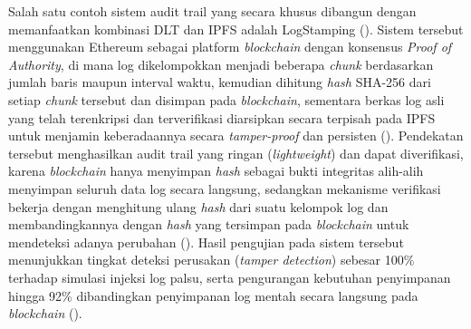 Salah satu contoh sistem audit trail yang secara khusus dibangun dengan memanfaatkan kombinasi DLT dan IPFS adalah LogStamping (\cite{islam2025logstamping}). Sistem tersebut menggunakan Ethereum sebagai platform \textit{blockchain} dengan konsensus \textit{Proof of Authority}, di mana log dikelompokkan menjadi beberapa \textit{chunk} berdasarkan jumlah baris maupun interval waktu, kemudian dihitung \textit{hash} SHA-256 dari setiap \textit{chunk} tersebut dan disimpan pada \textit{blockchain}, sementara berkas log asli yang telah terenkripsi dan terverifikasi diarsipkan secara terpisah pada IPFS untuk menjamin keberadaannya secara \textit{tamper-proof} dan persisten (\cite{islam2025logstamping}). Pendekatan tersebut menghasilkan audit trail yang ringan (\textit{lightweight}) dan dapat diverifikasi, karena \textit{blockchain} hanya menyimpan \textit{hash} sebagai bukti integritas alih-alih menyimpan seluruh data log secara langsung, sedangkan mekanisme verifikasi bekerja dengan menghitung ulang \textit{hash} dari suatu kelompok log dan membandingkannya dengan \textit{hash} yang tersimpan pada \textit{blockchain} untuk mendeteksi adanya perubahan (\cite{islam2025logstamping}). Hasil pengujian pada sistem tersebut menunjukkan tingkat deteksi perusakan (\textit{tamper detection}) sebesar 100\% terhadap simulasi injeksi log palsu, serta pengurangan kebutuhan penyimpanan hingga 92\% dibandingkan penyimpanan log mentah secara langsung pada \textit{blockchain} (\cite{islam2025logstamping}).

